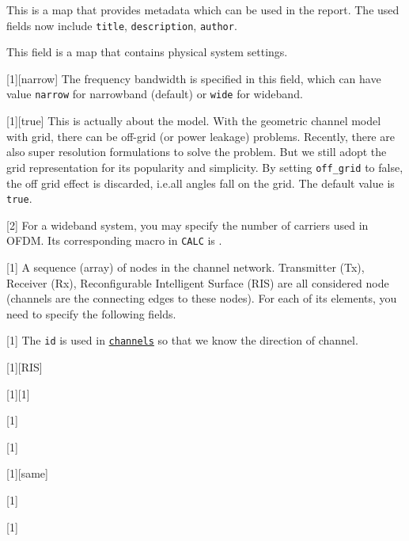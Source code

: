 This is a map that provides metadata which can be used in the report.
The used fields now include
\texttt{title},
\texttt{description},
\texttt{author}.

This field is a map that contains physical system settings.

[1][narrow]
The frequency bandwidth is specified in this field,
which can have value \texttt{narrow} for narrowband (default)
or \texttt{wide} for wideband.

[1][true]
This is actually about the model.
With the geometric channel model with grid,
there can be off-grid (or power leakage) problems.
Recently, there are also super resolution formulations to solve the problem.
But we still adopt the grid representation for its popularity and simplicity.
By setting \texttt{off\_grid} to false,
the off grid effect is discarded, i.e.\@ all angles fall on the grid.
The default value is \texttt{true}.

[2]
For a wideband system,
you may specify the number of carriers used in OFDM.
Its corresponding
macro %
in
\texttt{CALC} %
is .

[1]
A sequence (array) of nodes in the channel network.
Transmitter (Tx), Receiver (Rx), Reconfigurable Intelligent Surface (RIS)
are all considered node (channels are the connecting edges to these nodes).
For each of its elements, you need to specify the following fields.

[1]
The \texttt{id} is used in \hyperref[d:subsec:sim_config_channels]{\texttt{channels}} so that we know the direction of channel.

[1][RIS]

[1][1]

[1]

[1]

[1][same]

[1]


[1]

